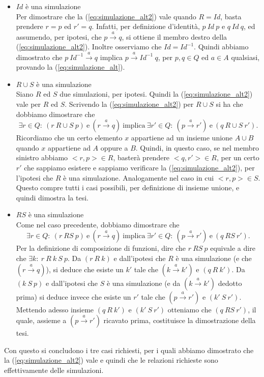     \begin{itemize}
        \item $Id$ è una simulazione\\
            Per dimostrare che la (\ref{eq:simulazione_alt2}) vale quando $R=Id$, basta prendere $r=p$ ed $r'=q$. Infatti, per definizione d'identità, $p\ Id\ p$ e $q\ Id\ q$, ed assumendo, per ipotesi, che $p \xrightarrow{a} q$, si ottiene il membro destro della (\ref{eq:simulazione_alt2}). Inoltre osserviamo che $Id=Id^{-1}$. Quindi abbiamo dimostrato che $p\ Id^{-1}\xrightarrow{a} q$ implica $p \xrightarrow{a}Id^{-1}\ q$, per $p,q\in Q$ ed $a\in A$ qualsiasi, provando la (\ref{eq:simulazione_alt}).
        \item $R \cup S$ è una simulazione\\
            Siano $R$ ed $S$ due simulazioni, per ipotesi. Quindi la (\ref{eq:simulazione_alt2}) vale per $R$ ed $S$. Scrivendo la (\ref{eq:simulazione_alt2}) per $R \cup S$ si ha che dobbiamo dimostrare che
            \begin{equation*}
                \exists r\in Q:\ (r\ R \cup S\ p)\ \mbox{e}\ (r \xrightarrow{a} q)\ \mbox{implica}\ \exists r'\in Q:\ (p \xrightarrow{a} r')\ \mbox{e}\ (q\ R \cup S\ r').
            \end{equation*}
            Ricordiamo che un certo elemento $x$ appartiene ad un insieme unione $A \cup B$ quando $x$ appartiene ad $A$ oppure a $B$. Quindi, in questo caso, se nel membro sinistro abbiamo $<r,p>\in R$, basterà prendere $<q,r'>\in R$, per un certo $r'$ che sappiamo esistere e sappiamo verificare la (\ref{eq:simulazione_alt2}), per l'ipotesi che $R$ è una simulazione. Analogamente nel caso in cui $<r,p> \in S$. Questo compre tutti i casi possibili, per definizione di insieme unione, e quindi dimostra la tesi.
        \item $RS$ è una simulazione\\
            Come nel caso precedente, dobbiamo dimostrare che
            \begin{equation*}
                \exists r\in Q:\ (r\ RS\ p)\ \mbox{e}\ (r \xrightarrow{a} q)\ \mbox{implica}\ \exists r'\in Q:\ (p \xrightarrow{a} r')\ \mbox{e}\ (q\ RS\ r').
            \end{equation*}
            Per la definizione di composizione di funzioni, dire che $r\ RS\ p$ equivale a dire che $\exists k:\ r\ R\ k\ S\ p$. Da $(r\ R\ k)$ e dall'ipotesi che $R$ è una simulazione (e che $(r \xrightarrow{a} q)$), si deduce che esiste un $k'$ tale che $(k \xrightarrow{a} k')$ e $(q\ R\ k')$. Da $(k\ S\ p)$ e dall'ipotesi che $S$ è una simulazione (e da $(k \xrightarrow{a} k')$ dedotto prima) si deduce invece che esiste un $r'$ tale che $(p \xrightarrow{a} r')$ e $(k'\ S\ r')$.\\
            Mettendo adesso insieme $(q\ R\ k')$ e $(k'\ S\ r')$ otteniamo che $(q\ RS\ r')$, il quale, assieme a $(p \xrightarrow{a} r')$ ricavato prima, costituisce la dimostrazione della tesi.
    \end{itemize}
    
    Con questo si concludono i tre casi richiesti, per i quali abbiamo dimostrato che la (\ref{eq:simulazione_alt2}) vale e quindi che le relazioni richieste sono effettivamente delle simulazioni.
    